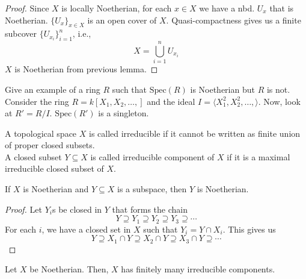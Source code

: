 \documentclass[oneside, 12pt, ]{scrbook}
\newcommand{\spec}{\mathrm{Spec}}
\theoremstyle{theorem}
\begin{document}
\begin{proof}
Since $X$ is locally Noetherian, for each $x\in X$ we have a nbd. $U_{x}$ that is Noetherian. $\{U_{x}\}_{x \in X}$ is an open cover of $X$. Quasi-compactness gives us a finite subcover $\{U_{x_{i}}\}_{i=1}^n$, i.e., $$X = \bigcup_{i=1}^n U_{x_{i}}$$ $X$ is Noetherian from previous lemma.
\end{proof}

\begin{exercise}
Give an example of a ring $R$ such that $\spec(R)$ is Noetherian but $R$ is not. \\

Consider the ring $R=k[X_{1}, X_{2}, \hdots , ]$ and the ideal $I = \langle X_{1}^2 , X_{2}^2 , \hdots , \rangle$. Now, look at $R'=R/I$. $\spec(R')$ is a singleton. 
\end{exercise}

\begin{definition}
A topological space $X$ is called irreducible if it cannot be written as finite union of proper closed subsets. \\

A closed subset $Y \subseteq X$ is called irreducible component of $X$ if it is a maximal irreducible closed subset of $X$.
\end{definition}

\begin{lemma}
If $X$ is Noetherian and $Y \subseteq X$ is a subspace, then $Y$ is Noetherian. 
\end{lemma}

\begin{proof}
Let $Y_{i}$s be closed in $Y$ that forms the chain $$Y \supseteq Y_{1} \supseteq Y_{2} \supseteq Y_{3} \supseteq \cdots $$ For each $i$, we have a closed set in $X$ such that $Y_{i} = Y \cap X_{i}$. This gives us $$Y \supseteq X_{1}\cap Y \supseteq X_{2}\cap Y \supseteq X_{3}\cap Y \supseteq \cdots $$
\end{proof}

\begin{lemma}
Let $X$ be Noetherian. Then, $X$ has finitely many irreducible components. 
\end{lemma}
\end{document}
